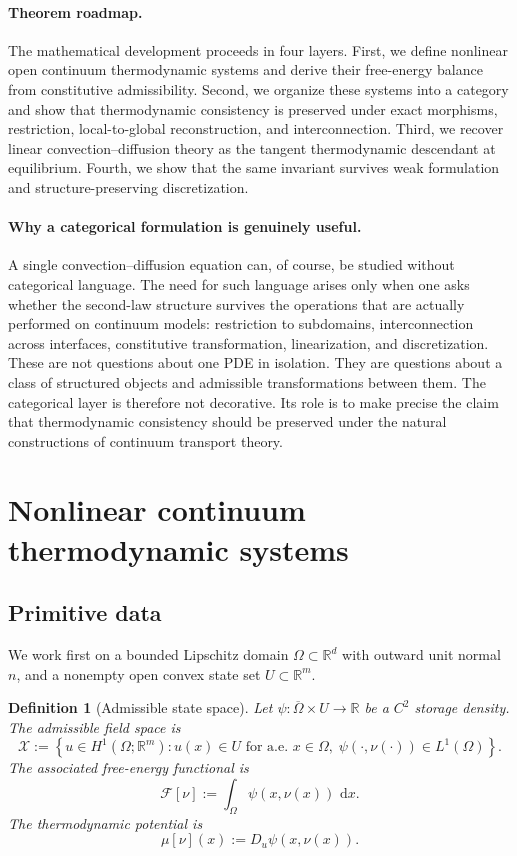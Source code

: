 \documentclass[11pt]{article}
\newtheorem{definition}[theorem]{Definition}
\newcommand{\R}{\mathbb{R}}
\newcommand{\Om}{\Omega}
\newcommand{\cl}{\overline}
\newcommand{\dd}{\,\mathrm{d}}
\newcommand{\F}{\mathcal{F}}
\newcommand{\X}{\mathcal{X}}
\begin{document}
\paragraph{Theorem roadmap.}
The mathematical development proceeds in four layers. First, we define nonlinear
open continuum thermodynamic systems and derive their free-energy balance from
constitutive admissibility. Second, we organize these systems into a category and
show that thermodynamic consistency is preserved under exact morphisms, restriction,
local-to-global reconstruction, and interconnection. Third, we recover linear
convection--diffusion theory as the tangent thermodynamic descendant at equilibrium.
Fourth, we show that the same invariant survives weak formulation and
structure-preserving discretization.

\paragraph{Why a categorical formulation is genuinely useful.}
A single convection--diffusion equation can, of course, be studied without
categorical language. The need for such language arises only when one asks whether
the second-law structure survives the operations that are actually performed on
continuum models: restriction to subdomains, interconnection across interfaces,
constitutive transformation, linearization, and discretization. These are not
questions about one PDE in isolation. They are questions about a class of structured
objects and admissible transformations between them. The categorical layer is
therefore not decorative. Its role is to make precise the claim that thermodynamic
consistency should be preserved under the natural constructions of continuum
transport theory.

\section{Nonlinear continuum thermodynamic systems}

\subsection{Primitive data}

We work first on a bounded Lipschitz domain \(\Om\subset\R^d\) with outward unit
normal \(n\), and a nonempty open convex state set \(U\subset\R^m\).

\begin{definition}[Admissible state space]
Let \(\psi:\cl{\Om}\times U\to\R\) be a \(C^2\) storage density. The admissible field
space is
\[
\X
:=
\left\{
u\in H^1(\Om;\R^m):
u(x)\in U \text{ for a.e. }x\in\Om,\;
\psi(\cdot,\nu(\cdot))\in L^1(\Om)
\right\}.
\]
The associated free-energy functional is
\begin{equation}\label{eq:F-def}
\F[\nu]
:=
\int_\Om \psi(x,\nu(x))\,\dd x.
\end{equation}
The thermodynamic potential is
\begin{equation}\label{eq:mu-def}
\mu[\nu](x):=D_u\psi(x,\nu(x)).
\end{equation}
\end{definition}
\end{document}
